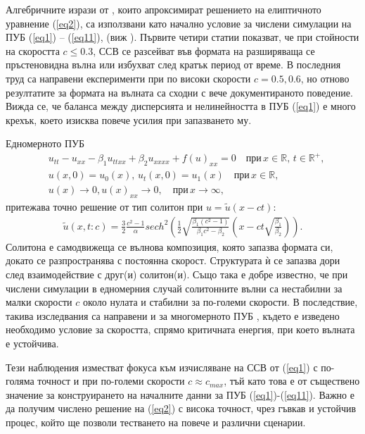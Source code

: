 \documentclass[a5paper]{article}
\newcommand{\rf}[1]{(\ref{#1})}
\newcommand{\RR}{\mathbb{R}}
\theoremstyle{remark}
\begin{document}
\begin{normalsize}
Алгебричните изрази от \cite{ref15}, които апроксимират решението на елиптичното уравнение \rf{eq2}, са използвани като начално условие за числени симулации на ПУБ \rf{eq1} -- \rf{eq11}, 
(виж  \cite{ref21, ref20, ref23, ref22, ref25}). Първите четири статии показват, че при стойности на скоростта $c \le 0.3$, ССВ се разсейват във формата на разширяваща се пръстеновидна вълна или избухват след кратък период от време. В последния труд \cite{ref25} са направени експерименти при по високи скорости $c=0.5,0.6$, 
но отново резултатите за формата на вълната са сходни с вече документираното поведение. 
Вижда се, че баланса между дисперсията и нелинейността в ПУБ \rf{eq1} е много крехък, 
което изисква повече усилия при запазването му. 

Едномерното ПУБ
\begin{align}
&u_{tt} - u_{xx} -\beta_1  u_{ttxx} +\beta_2 u_{xxxx} + f(u)_{xx}=0   \quad \text{при} \,  x \in \RR, \, t\in\RR^+,\label{eq1D}
\\ \nonumber &u(x,0)=u_0(x), \, u_t(x,0)=u_1(x)   \quad\text{при} \, x \in \RR,
\\  &u(x) \rightarrow 0,  u(x)_{xx} \rightarrow 0 ,  \quad \text{при} \, x \rightarrow \infty, \label{eq1d1}
\end{align}
притежава точно решение от тип солитон при $u =\tilde u(x-ct)$:
\begin{align}
\tilde u(x,t:c) = \frac{3}{2} \frac{c^2-1}{\alpha}sech^2 \left( \frac{1}{2}  \sqrt{ \frac{\beta_1 (c^2-1)}{\beta_1 c^2-\beta_2}} (x-c t \sqrt{\frac{\beta_1}{\beta_2}} ) \right).
\end{align}
Солитона е самодвижеща се вълнова композиция, която запазва формата си, докато се разпространява с постоянна скорост. Структурата ѝ се запазва дори след взаимодействие с друг(и) солитон(и).
Също така е добре известно, 
че при числени симулации в едномерния случай солитонните вълни са нестабилни за малки скорости $c$ около нулата и стабилни за 
по-големи скорости. В последствие, такива изследвания са направени и за многомерното ПУБ \cite{ref1c0}, където е изведено необходимо условие за скоростта, спрямо критичната енергия, при което вълната е устойчива.

Тези наблюдения изместват фокуса към изчисляване на ССВ от \rf{eq1} с по-голяма точност и при по-големи скорости $c \approx c_{max}$, тъй като това е от съществено значение за конструирането на началните данни за ПУБ \rf{eq1}-\rf{eq11}. Важно е да получим числено решение на \rf{eq2} с висока точност, чрез гъвкав и устойчив процес, който ще позволи тестването на повече и различни сценарии.


\end{normalsize}
\end{document}
